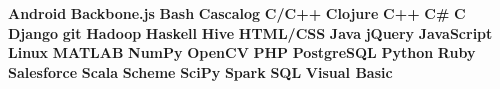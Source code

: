  \setlength{\parindent}{0pt}

  \newcommand{\skill}{\textbf}
  \newcommand{\skills}[2]{
  \item #2 #1
  }

  \newcommand{\institution}{\textsc}

  \def\div{\,\textbar{}\,}

  \usepackage{xspace}


  \newcommand{\lang}[2]{\expandafter\def\csname #1\endcsname{\skill{#2}\xspace}}

  \lang{android}{Android}
  \lang{backbone}{Backbone.js}
  \lang{bash}{Bash}
  \lang{cascalog}{Cascalog}
  \lang{ccpp}{C/C++}
  \lang{clojure}{Clojure}
  \lang{cpp}{C++}
  \lang{csh}{C\#}
  \lang{c}{C}
  \lang{django}{Django}
  \lang{git}{git}
  \lang{hadoop}{Hadoop}
  \lang{haskell}{Haskell}
  \lang{hive}{Hive}
  \lang{html}{HTML/CSS}
  \lang{java}{Java}
  \lang{jquery}{jQuery}
  \lang{js}{JavaScript}
  \lang{linux}{Linux}
  \lang{matlab}{MATLAB}
  \lang{numpy}{NumPy}
  \lang{opencv}{OpenCV}
  \lang{php}{PHP}
  \lang{postgres}{PostgreSQL}
  \lang{python}{Python}
  \lang{ruby}{Ruby}
  \lang{salesforce}{Salesforce}
  \lang{scala}{Scala}
  \lang{scheme}{Scheme}
  \lang{scipy}{SciPy}
  \lang{spark}{Spark}
  \lang{sql}{SQL}
  \lang{visb}{Visual Basic}

  \makeatletter
  \newcommand{\github}[1]{\def\@github{#1}}
  \newcommand{\mobile}[1]{\def\@mobile{#1}}
  \newcommand{\email}[1]{\def\@email{#1}}
  \newcommand{\linkedin}[1]{\def\@linkedin{#1}}
  \newcommand{\homepage}[1]{\def\@homepage{#1}}

  \newcommand{\headersocialstyle}[1]{{\fontsize{6.8pt}{1em} #1}}
  \newcommand{\headersocialsep}[1][\textbar\quad]{\def\@headersocialsep{#1}}
  \headersocialsep

